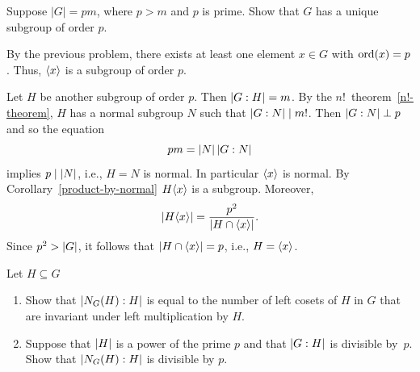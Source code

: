 \begin{solution}
\begin{enumerate}[\upshape a)]
\end{enumerate}
\end{solution}

\begin{probl}\label{problem-1.A.9}
    Suppose $|G| = pm$, where $p > m$ and $p$ is prime. Show that $G$ has a unique subgroup of order $p$.
\end{probl}

\begin{solution} By the previous problem, there exists at least one element $x\in G$ with ${\rm ord}(x)=p$. Thus, $\langle x\rangle$ is a subgroup of order $p$.

Let $H$ be another subgroup of order $p$. Then $\left\vert{G:H}\right\vert=m$. By the $n!$~theorem~\ref{n!-theorem}, $H$ has a normal subgroup $N$ such that $\left\vert{G:N}\right\vert\mid m!$. Then $\left\vert{G:N}\right\vert\perp p$ and so the equation
$$
    pm=\left\vert{N}\right\vert\left\vert{G:N}\right\vert
$$
implies $p\mid\left\vert{N}\right\vert$, i.e., $H=N$ is normal. In particular $\langle x\rangle$ is normal. By Corollary~\ref{product-by-normal} $H\langle x\rangle$ is a subgroup. Moreover,
$$
    \left\vert{H\langle x\rangle}\right\vert = \frac{p^2}{\left\vert{H\cap\langle x\rangle}\right\vert}.
$$
Since $p^2>\left\vert{G}\right\vert$, it follows that $\left\vert{H\cap\langle x\rangle}\right\vert=p$, i.e., $H=\langle x\rangle$.  \end{solution}

\begin{probl}\label{problem-1.A.10}
    Let $H\subseteq G$
    \begin{enumerate}[\upshape a)]
        \item Show that $\left\vert{N_G(H):H}\right\vert$ is equal to the number of left cosets of\/ $H$ in $G$ that are invariant under left multiplication by $H$.

        \item Suppose that $\left\vert{H}\right\vert$ is a power of the prime $p$ and that $\left\vert{G:H}\right\vert$ is divisible by~$p$. Show that $\left\vert{N_G(H):H}\right\vert$ is divisible by\/ $p$.
    \end{enumerate}
\end{probl}

